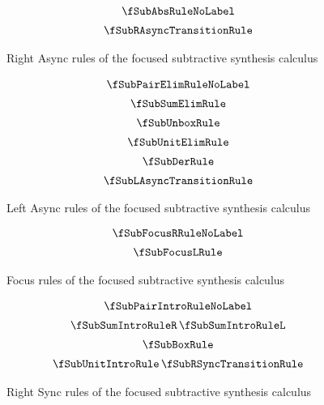\begin{figure}[H]
  \begin{align*}
\begin{array}{c}
  \fSubAbsRuleNoLabel
  \\[0.5em]
  \fSubRAsyncTransitionRule
  \end{array}
  \end{align*}
  \caption{Right Async rules of the focused subtractive synthesis calculus}
  \label{fig:focus-sub-right-async}
\end{figure}

\begin{figure}[H]
  \begin{align*}
\begin{array}{c}
  \fSubPairElimRuleNoLabel
  \\[0.5em]
  \fSubSumElimRule
  \\[0.5em]
  \fSubUnboxRule
  \\[0.5em]
  \fSubUnitElimRule
  \\[0.5em]
  \fSubDerRule
  \\[0.5em]
  \fSubLAsyncTransitionRule
  \end{array}
  \end{align*}
  \caption{Left Async rules of the focused subtractive synthesis calculus}
  \label{fig:focus-sub-left-async}
\end{figure}

\begin{figure}[H]
  \begin{align*}
\begin{array}{c}
  \fSubFocusRRuleNoLabel
  \\[0.5em]
  \fSubFocusLRule
  \end{array}
  \end{align*}
  \caption{Focus rules of the focused subtractive synthesis calculus}
  \label{fig:focus-sub-focus}
\end{figure}

\begin{figure}[H]
  \begin{align*}
\begin{array}{c}
\fSubPairIntroRuleNoLabel
  \\[0.5em]
  \fSubSumIntroRuleR
  \,
  \fSubSumIntroRuleL
  \\[0.5em]
  \fSubBoxRule
  \\[0.5em]
  \fSubUnitIntroRule
  \,
  \fSubRSyncTransitionRule
  \end{array}
  \end{align*}
  \caption{Right Sync rules of the focused subtractive synthesis calculus}
  \label{fig:focus-sub-right-sync}
\end{figure}

